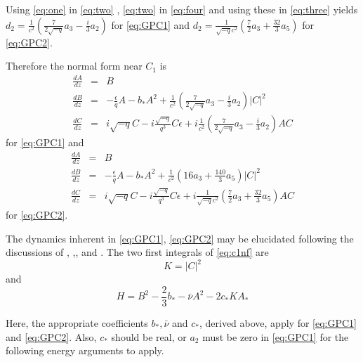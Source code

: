 Using \eqref{eq:one} in \eqref{eq:two} , \eqref{eq:two} in \eqref{eq:four} and using these in \eqref{eq:three} yields 
$ d_2 = \frac{1}{c^2}\left( \frac{7}{2 \sqrt{-q} } a_3 - \frac{i}{3} a_2 \right)$ for \eqref{eq:GPC1} and 
$ d_2 = \frac{1}{\sqrt{-q} c^2}\left( \frac{7}{2 } a_3 + \frac{32}{3} a_5 \right)$  for \eqref{eq:GPC2}. 

Therefore the normal form near $C_1$ is 
\begin{subequations}
\begin{eqnarray} \label{eq:GPC1normal}
\frac{dA}{dz} &=& B \\ \label{eq:GPC1normalA}
\frac{dB}{dz} &=& -\frac{\epsilon}{q} A - b_* A^2 + \frac{1}{c^2}\left( \frac{7}{2 \sqrt{-q} } a_3 - \frac{i}{3} a_2 \right)  \left|C\right|^2 \\ \label{eq:GPC1normalB}
\frac{dC}{dz} &=& i \sqrt{-q} C - i \frac{\sqrt{-q} }{q^3} C\epsilon + i \frac{1}{c^2}\left( \frac{7}{2 \sqrt{-q} } a_3 - \frac{i}{3} a_2 \right)A C \label{eq:GPC1normalC}
\end{eqnarray}
\end{subequations}
for \eqref{eq:GPC1} and
\begin{subequations}
\begin{eqnarray} \label{eq:GPC2normal}
\frac{dA}{dz} &=& B \\ \label{eq:GPC2normalA}
\frac{dB}{dz} &=& -\frac{\epsilon}{q} A - b_* A^2 + \frac{1}{c^2}\left( 16 a_3 + \frac{140}{3} a_5 \right)  \left|C\right|^2 \\ \label{eq:GPC2normalB}
\frac{dC}{dz} &=& i \sqrt{-q} C - i \frac{\sqrt{-q} }{q^3} C\epsilon + i \frac{1}{\sqrt{-q} c^2}\left( \frac{7}{2 } a_3 + \frac{32}{3} a_5 \right)A C \label{eq:GPC2normalC}
\end{eqnarray}
\end{subequations}
for \eqref{eq:GPC2}.

The dynamics inherent in \eqref{eq:GPC1}, \eqref{eq:GPC2} may be elucidated following the discussions of \cite{IK}, \cite{Lombardi1},\cite{Lombardi2}, and \cite{IA}.
The two first integrals of \eqref{eq:c1nf}  are
\begin{equation}
K = \left| C \right|^2
\end{equation}
and
\begin{equation}
H = B^2 - \frac{2}{3} b_* - \bar{\nu} A^2 - 2 c_* K A_*
\end{equation}

Here, the appropriate coefficients $b_*, \bar{\nu}$ and $ c_*$, derived above, apply for \eqref{eq:GPC1} and \eqref{eq:GPC2}. 
Also, $c_*$ should be real, or $a_2$ must be zero in \eqref{eq:GPC1} for the following energy arguments to apply.


